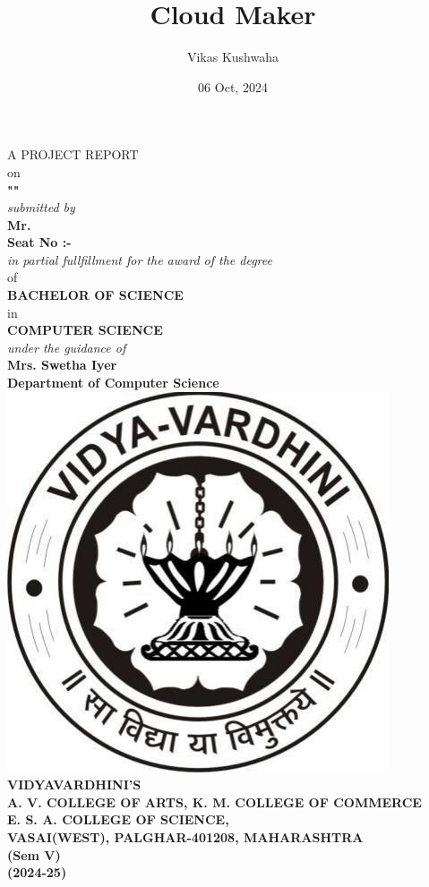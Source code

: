 \documentclass[12pt]{article}
\date{06 Oct, 2024}
\title{Cloud Maker}
\author{Vikas Kushwaha}
\makeatletter
\let\inserttitle\@title
\let\insertauthor\@author
\makeatother
\begin{document}
\iftrue  %


\begin{center}
	\fontsize{14pt}{28pt}\selectfont
	A PROJECT REPORT \\
	on \\
	\textbf{"\underline{\MakeUppercase{\inserttitle}}"} \\
	\textit{submitted by} \\
	\textbf{Mr. \insertauthor} \\
	\textbf{Seat No :-} \\
	\textit{in partial fullfillment for the award of the degree} \\
	of \\
	\textbf{BACHELOR OF SCIENCE} \\
	in \\
	\textbf{COMPUTER SCIENCE} \\
	\textit{under the guidance of} \\
	\textbf{Mrs. Swetha Iyer} \\
	\textbf{Department of Computer Science} \\
	\vspace{1cm}
	\includegraphics[scale=0.25]{vartak-logo} \\
	\fontsize{14pt}{20pt}\selectfont
	\textbf{VIDYAVARDHINI'S} \\
	\textbf{A. V. COLLEGE OF ARTS, K. M. COLLEGE OF COMMERCE} \\
	\textbf{E. S. A. COLLEGE OF SCIENCE,} \\
	\textbf{VASAI(WEST), PALGHAR-401208, MAHARASHTRA} \\
	\fontsize{14pt}{28pt}\selectfont
	\textbf{(Sem V)} \\
	\textbf{(2024-25)} \\
\end{center}
\end{document}
